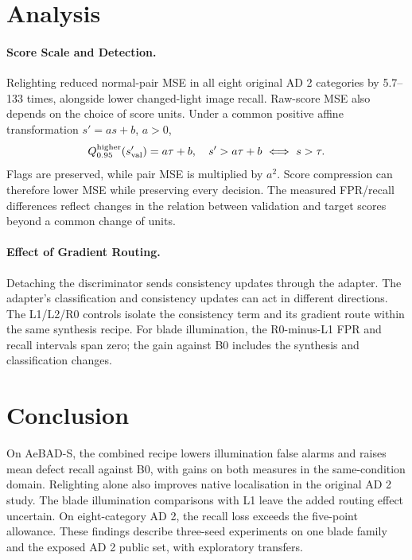 \documentclass[letterpaper]{article}
\begin{document}
\section{Analysis}

\paragraph{Score Scale and Detection.}
Relighting reduced normal-pair MSE in all eight original AD 2 categories by 5.7--133 times,
alongside lower changed-light image recall. Raw-score MSE also depends on the choice of
score units. Under a common positive affine transformation $s'=as+b$, $a>0$,
\begin{equation}
Q_{0.95}^{\rm higher}(s'_{\rm val})=a\tau+b,
 \quad s'>a\tau+b\ \Longleftrightarrow\ s>\tau.
\end{equation}
Flags are preserved, while pair MSE is multiplied by $a^2$. Score compression can therefore
lower MSE while preserving every decision. The measured FPR/recall differences reflect
changes in the relation between validation and target scores beyond a common change of
units.

\paragraph{Effect of Gradient Routing.}
Detaching the discriminator sends consistency updates through the adapter. The adapter's
classification and consistency updates can act in different directions. The L1/L2/R0 controls
isolate the consistency term and its gradient route within the same synthesis recipe. For
blade illumination, the R0-minus-L1 FPR and recall intervals span zero; the gain against B0
includes the synthesis and classification changes.

\section{Conclusion}

On AeBAD-S, the combined recipe lowers illumination false alarms and raises mean defect
recall against B0, with gains on both measures in the same-condition domain. Relighting
alone also improves native localisation in the original AD 2 study. The blade illumination
comparisons with L1 leave the added routing effect uncertain. On eight-category AD 2, the
recall loss exceeds the five-point allowance. These findings describe three-seed experiments
on one blade family and the exposed AD 2 public set, with exploratory transfers.


\end{document}
